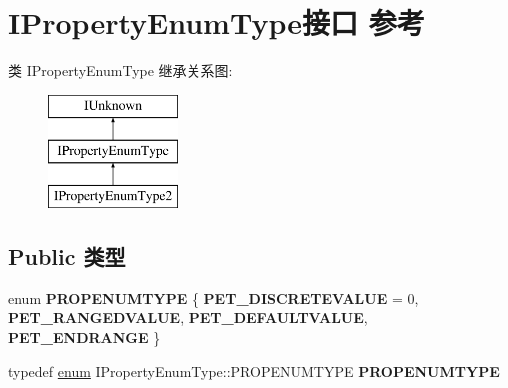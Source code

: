 \hypertarget{interface_i_property_enum_type}{}\section{I\+Property\+Enum\+Type接口 参考}
\label{interface_i_property_enum_type}
类 I\+Property\+Enum\+Type 继承关系图\+:\begin{figure}[H]
\begin{center}
\leavevmode
\includegraphics[height=3.000000cm]{interface_i_property_enum_type}
\end{center}
\end{figure}
\subsection*{Public 类型}
\begin{DoxyCompactItemize}
\item 
\mbox{\label{interface_i_property_enum_type_a17f4cd525faff28f0f42d4af0d493b04}} 
enum {\bfseries P\+R\+O\+P\+E\+N\+U\+M\+T\+Y\+PE} \{ {\bfseries P\+E\+T\+\_\+\+D\+I\+S\+C\+R\+E\+T\+E\+V\+A\+L\+UE} = 0, 
{\bfseries P\+E\+T\+\_\+\+R\+A\+N\+G\+E\+D\+V\+A\+L\+UE}, 
{\bfseries P\+E\+T\+\_\+\+D\+E\+F\+A\+U\+L\+T\+V\+A\+L\+UE}, 
{\bfseries P\+E\+T\+\_\+\+E\+N\+D\+R\+A\+N\+GE}
 \}
\item 
\mbox{\label{interface_i_property_enum_type_a35fd71c8968078256a0ed6ac23626cc7}} 
typedef \hyperlink{interfaceenum}{enum} I\+Property\+Enum\+Type\+::\+P\+R\+O\+P\+E\+N\+U\+M\+T\+Y\+PE {\bfseries P\+R\+O\+P\+E\+N\+U\+M\+T\+Y\+PE}
\end{DoxyCompactItemize}

